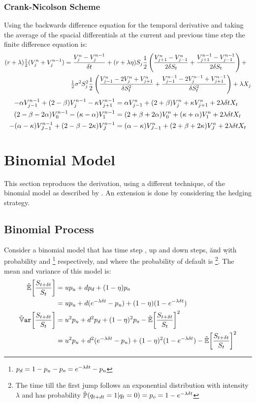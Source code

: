 \documentclass[a4paper,11pt,oneside]{report}
\theoremstyle{plain}
\theoremstyle{definition}
\begin{document}
\subsection{Crank-Nicolson Scheme}
Using the backwards difference equation for the temporal derivative and taking the average of the spacial differentials at the current and previous time step the finite difference equation is:
\small\begin{align*}
 (r + \lambda)\tfrac{1}{2}(V^{n}_j + V^{n - 1}_j) &= \frac{V^{n}_j - V^{n - 1}_j}{\delta t} + (r + \lambda\eta)S_j\frac{1}{2}\left(\frac{V^{n}_{j + 1} - V^{n}_{j - 1}}{2\delta S_t} + \frac{V^{n - 1}_{j + 1} - V^{n - 1}_{j - 1}}{2\delta S_t}\right) + \\
  &\quad \tfrac{1}{2}\sigma^2S_j^2\frac{1}{2}\left(\frac{V^{n}_{j - 1} - 2V^{n}_j + V^{n}_{j + 1}}{\delta S_t^2} + \frac{V^{n - 1}_{j - 1} - 2V^{n - 1}_j + V^{n - 1}_{j + 1}}{\delta S_t^2}\right) + \lambda X_j
\end{align*}
\begin{align}
 -\alpha V^{n - 1}_{j - 1} + (2 - \beta)V^{n - 1}_j - \kappa V^{n - 1}_{j + 1} &= \alpha V^{n}_{j - 1} + (2 + \beta)V^{n}_j + \kappa V^{n}_{j + 1} + 2\lambda\delta tX_t \\
 (2 - \beta - 2\alpha)V^{n - 1}_{0} - (\kappa - \alpha)V^{n - 1}_{1} &= (2 + \beta + 2\alpha)V^{n}_{0} + (\kappa + \alpha)V^{n}_{1} + 2\lambda\delta tX_t \\
 -(\alpha - \kappa)V^{n - 1}_{J - 1} + (2 - \beta - 2\kappa)V^{n - 1}_{J} &= (\alpha - \kappa)V^{n}_{J - 1} + (2 + \beta + 2\kappa)V^{n}_{J} + 2\lambda\delta tX_t
\end{align}\normalsize


\chapter{Binomial Model}
This section reproduces the derivation, using a different technique, of the binomial model as described by \citet{MK12}.  An extension is done by considering the hedging strategy.


\section{Binomial Process}
Consider a binomial model that has time step \Dt, up and down steps, \u and \d with probability \pu and \pd\footnote{$p_d = 1 - p_u - p_o = e^{-\lambda\delta t} - p_u$} respectively, and where the probability of default is \po\footnote{The time till the first jump follows an exponential distribution with intensity $\lambda$ and has probability $\Prob(q_{t + \dt} = 1 | q_t = 0) = \po = 1 - e^{-\lambda\Dt}$}.  The mean and variance of this model is:
\begin{align}
 \E[\frac{\SDt}{\S}]   &= \u\pu + \d\pd + (1 - \eta)\po \n
                       &= \u\pu + \d(e^{-\lambda\Dt} - \pu) + (1 - \eta)(1 - e^{-\lambda\Dt}) \label{eq:BM_E} \\
 \Var[\frac{\SDt}{\S}] &= \u^2\pu + \d^2\pd + (1 - \eta)^2\po - \E[\frac{\SDt}{\S}]^2 \n
                       &= \u^2\pu + \d^2(e^{-\lambda\Dt} - \pu) + (1 - \eta)^2(1 - e^{-\lambda\Dt}) - \E[\frac{\SDt}{\S}]^2 \label{eq:BM_Var}
\end{align}
\end{document}
